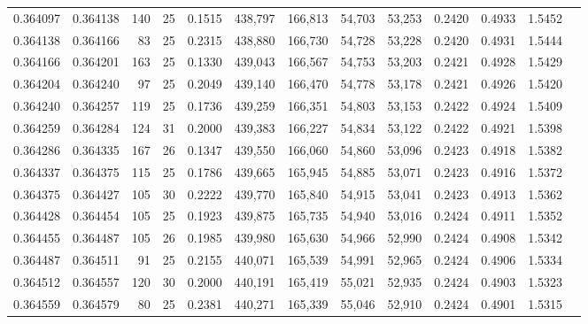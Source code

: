 \begin{tabular}{rrrrrrrrrrrrr}
0.364097 & 0.364138 &   140 &  25 &                                     0.1515 & 438,797 & 166,813 &  54,703 &  53,253 & 0.2420 & 0.4933 & 1.5452 \\
0.364138 & 0.364166 &    83 &  25 &                                     0.2315 & 438,880 & 166,730 &  54,728 &  53,228 & 0.2420 & 0.4931 & 1.5444 \\
0.364166 & 0.364201 &   163 &  25 &                                     0.1330 & 439,043 & 166,567 &  54,753 &  53,203 & 0.2421 & 0.4928 & 1.5429 \\
0.364204 & 0.364240 &    97 &  25 &                                     0.2049 & 439,140 & 166,470 &  54,778 &  53,178 & 0.2421 & 0.4926 & 1.5420 \\
0.364240 & 0.364257 &   119 &  25 &                                     0.1736 & 439,259 & 166,351 &  54,803 &  53,153 & 0.2422 & 0.4924 & 1.5409 \\
0.364259 & 0.364284 &   124 &  31 &                                     0.2000 & 439,383 & 166,227 &  54,834 &  53,122 & 0.2422 & 0.4921 & 1.5398 \\
0.364286 & 0.364335 &   167 &  26 &                                     0.1347 & 439,550 & 166,060 &  54,860 &  53,096 & 0.2423 & 0.4918 & 1.5382 \\
0.364337 & 0.364375 &   115 &  25 &                                     0.1786 & 439,665 & 165,945 &  54,885 &  53,071 & 0.2423 & 0.4916 & 1.5372 \\
0.364375 & 0.364427 &   105 &  30 &                                     0.2222 & 439,770 & 165,840 &  54,915 &  53,041 & 0.2423 & 0.4913 & 1.5362 \\
0.364428 & 0.364454 &   105 &  25 &                                     0.1923 & 439,875 & 165,735 &  54,940 &  53,016 & 0.2424 & 0.4911 & 1.5352 \\
0.364455 & 0.364487 &   105 &  26 &                                     0.1985 & 439,980 & 165,630 &  54,966 &  52,990 & 0.2424 & 0.4908 & 1.5342 \\
0.364487 & 0.364511 &    91 &  25 &                                     0.2155 & 440,071 & 165,539 &  54,991 &  52,965 & 0.2424 & 0.4906 & 1.5334 \\
0.364512 & 0.364557 &   120 &  30 &                                     0.2000 & 440,191 & 165,419 &  55,021 &  52,935 & 0.2424 & 0.4903 & 1.5323 \\
0.364559 & 0.364579 &    80 &  25 &                                     0.2381 & 440,271 & 165,339 &  55,046 &  52,910 & 0.2424 & 0.4901 & 1.5315 \\

\end{tabular}

